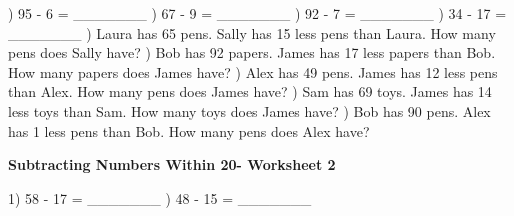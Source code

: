 \documentclass{article}%
\begin{document}
\newline%
) 95 {-} 6 = \_\_\_\_\_\_\_%
\newline%
\newline%
) 67 {-} 9 = \_\_\_\_\_\_\_%
\newline%
\newline%
) 92 {-} 7 = \_\_\_\_\_\_\_%
\newline%
\newline%
) 34 {-} 17 = \_\_\_\_\_\_\_%
\newline%
\newline%
) Laura has 65 pens. Sally has 15 less pens than Laura. How many pens does Sally have?%
\newline%
\newline%
) Bob has 92 papers. James has 17 less papers than Bob. How many papers does James have?%
\newline%
\newline%
) Alex has 49 pens. James has 12 less pens than Alex. How many pens does James have?%
\newline%
\newline%
) Sam has 69 toys. James has 14 less toys than Sam. How many toys does James have?%
\newline%
\newline%
) Bob has 90 pens. Alex has 1 less pens than Bob. How many pens does Alex have?%
\newline%
\newline%
\newline%
\pagebreak%
\large%
\begin{center}%
\textbf{Subtracting Numbers Within 20- Worksheet 2}%
\newline%
\newline%
\newline%
\end{center} \normalsize%
1) 58 {-} 17 = \_\_\_\_\_\_\_%
\newline%
\newline%
) 48 {-} 15 = \_\_\_\_\_\_\_%
\newline%
\end{document}
